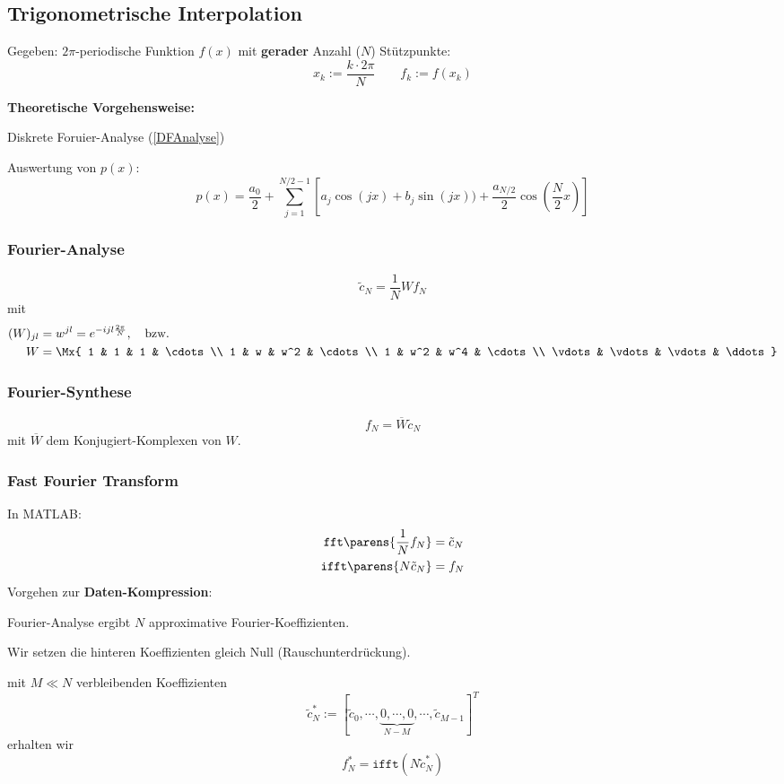 	\subsection{Trigonometrische Interpolation}
		Gegeben: $2\pi$-periodische Funktion $f(x)$ mit \textbf{gerader} Anzahl ($N$) Stützpunkte:
		\[
			x_k:=\frac{k\cdot 2\pi}{N} \qquad f_k:= f(x_k)
		\]
		
		\textbf{Theoretische Vorgehensweise:} 
		\begin{tightenumerate}
			\item Diskrete Foruier-Analyse (\ref{DFAnalyse}) 
			\item Auswertung von $p(x)$:
				\[
					p(x) = \frac{a_0}{2} + \sum_{j=1}^{N/2-1}\left[a_j\cos(jx) + b_j \sin(jx)) + \frac{a_{N/2}}{2}\cos\left(\frac{N}{2}x\right) \right]
				\]
		\end{tightenumerate}
		
		\subsubsection{Fourier-Analyse} 
			\begin{equation}
				\tilde c_N = \frac{1}{N}Wf_N \label{DFAnalyse} 
			\end{equation}
			mit
			\begin{align*}
				(W)_{jl} &= w^{jl} = e^{-ijl\frac{2\pi}{N}}, \quad \text{bzw.} \\
				W &= \Mx{
					1 & 1 & 1 & \cdots \\
					1 & w & w^2 & \cdots \\
					1 & w^2 & w^4 & \cdots \\
					\vdots & \vdots & \vdots & \ddots
				}
			\end{align*}

		\subsubsection{Fourier-Synthese}
			\[
				f_N = \overline{W}\tilde c_N
			\]
			mit $\overline{W}$ dem Konjugiert-Komplexen von $W$.

		\subsubsection{Fast Fourier Transform} In MATLAB:
			\begin{align*}
				\texttt{fft} \parens{ \frac{1}{N}f_N } &= \tilde c_N \\
				\texttt{ifft} \parens{ N \tilde c_N } &= f_N
			\end{align*}
			Vorgehen zur \textbf{Daten-Kompression}:
			\begin{tightenumerate}
				\item Fourier-Analyse ergibt $N$ approximative Fourier-Koeffizienten. 
				\item Wir setzen die hinteren Koeffizienten gleich Null (Rauschunterdrückung). 
				\item mit $M \ll N$ verbleibenden Koeffizienten
					\[
						\tilde c_N^* := [\tilde c_0, \cdots, \underbrace{0, \cdots, 0}_{N-M}, \cdots, \tilde c_{M-1}]^T
					\]
					erhalten wir
					\[
						f_N^* = \texttt{ifft}\left( N \tilde c_N^*\right)
					\]
			\end{tightenumerate}

